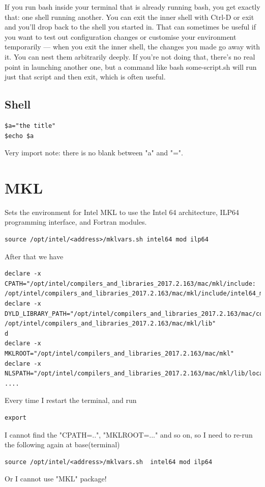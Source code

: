 If you run bash inside your terminal that is already running bash, you get exactly that: one shell running another. You can exit the inner shell with Ctrl-D or exit and you'll drop back to the shell you started in. That can sometimes be useful if you want to test out configuration changes or customise your environment temporarily — when you exit the inner shell, the changes you made go away with it. You can nest them arbitrarily deeply. If you're not doing that, there's no real point in launching another one, but a command like bash some-script.sh will run just that script and then exit, which is often useful.

\section{Shell}

\begin{verbatim}
$a="the title"
$echo $a
\end{verbatim}
Very import note: there is no blank between "a" and "=".


\chapter{MKL}

Sets the environment for Intel MKL to use the Intel 64 architecture, ILP64 programming interface, and Fortran modules.
\begin{verbatim}
source /opt/intel/<address>/mklvars.sh intel64 mod ilp64
\end{verbatim}

After that we have 
\begin{verbatim}
declare -x CPATH="/opt/intel/compilers_and_libraries_2017.2.163/mac/mkl/include:
/opt/intel/compilers_and_libraries_2017.2.163/mac/mkl/include/intel64_mac/ilp64"
declare -x DYLD_LIBRARY_PATH="/opt/intel/compilers_and_libraries_2017.2.163/mac/compiler/lib:
/opt/intel/compilers_and_libraries_2017.2.163/mac/mkl/lib"
d
declare -x MKLROOT="/opt/intel/compilers_and_libraries_2017.2.163/mac/mkl"
declare -x NLSPATH="/opt/intel/compilers_and_libraries_2017.2.163/mac/mkl/lib/locale/%l_%t/%N"
....
\end{verbatim}

Every time I restart the terminal,  and run 
\begin{verbatim}
export
\end{verbatim}
I cannot find the "CPATH=..", "MKLROOT=..." and so on, so I need to re-run the following again at base(terminal)
\begin{verbatim}
source /opt/intel/<address>/mklvars.sh  intel64 mod ilp64
\end{verbatim}
Or I cannot use "MKL" package!

